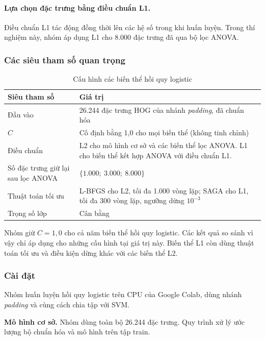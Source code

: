 \paragraph{Lựa chọn đặc trưng bằng điều chuẩn L1.} Điều chuẩn L1 tác động đồng thời lên các hệ số trong khi huấn luyện. Trong thí nghiệm này, nhóm áp dụng L1 cho 8.000 đặc trưng đã qua bộ lọc ANOVA.

\subsubsection{Các siêu tham số quan trọng}

\begin{table}[H]
\centering
\caption{Cấu hình các biến thể hồi quy logistic}
\label{tab:lr_hparams}
\small
\begin{tabularx}{\textwidth}{@{}l X@{}}
\toprule
\textbf{Siêu tham số} & \textbf{Giá trị} \\
\midrule
Đầu vào & 26.244 đặc trưng HOG của nhánh \emph{padding}, đã chuẩn hóa \\
$C$ & Cố định bằng 1,0 cho mọi biến thể (không tinh chỉnh) \\
Điều chuẩn & L2 cho mô hình cơ sở và các biến thể lọc ANOVA. L1 cho biến thể kết hợp ANOVA với điều chuẩn L1. \\
Số đặc trưng giữ lại sau lọc ANOVA & $\{1.000;\ 3.000;\ 8.000\}$ \\
Thuật toán tối ưu & L-BFGS cho L2, tối đa 1.000 vòng lặp; SAGA cho L1, tối đa 300 vòng lặp, ngưỡng dừng $10^{-3}$ \\
Trọng số lớp & Cân bằng \\
\bottomrule
\end{tabularx}
\end{table}

Nhóm giữ $C = 1{,}0$ cho cả năm biến thể hồi quy logistic. Các kết quả so sánh vì vậy chỉ áp dụng cho những cấu hình tại giá trị này. Biến thể L1 còn dùng thuật toán tối ưu và điều kiện dừng khác với các biến thể L2.

\subsubsection{Cài đặt}

Nhóm huấn luyện hồi quy logistic trên CPU của Google Colab, dùng nhánh \emph{padding} và cùng cách chia tập với SVM.

\textbf{Mô hình cơ sở.} Nhóm dùng toàn bộ 26.244 đặc trưng. Quy trình xử lý ước lượng bộ chuẩn hóa và mô hình trên tập train.

